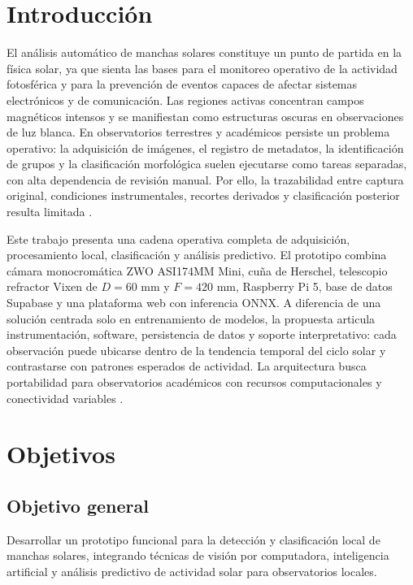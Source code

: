 \documentclass[a4paper,twocolumn,11pt]{article}
\begin{document}
\section{Introducción}
El análisis automático de manchas solares constituye un punto de partida en la física solar, ya que sienta las bases para el monitoreo operativo de la actividad fotosférica y para la prevención de eventos capaces de afectar sistemas electrónicos y de comunicación. Las regiones activas concentran campos magnéticos intensos y se manifiestan como estructuras oscuras en observaciones de luz blanca. En observatorios terrestres y académicos persiste un problema operativo: la adquisición de imágenes, el registro de metadatos, la identificación de grupos y la clasificación morfológica suelen ejecutarse como tareas separadas, con alta dependencia de revisión manual. Por ello, la trazabilidad entre captura original, condiciones instrumentales, recortes derivados y clasificación posterior resulta limitada \citep{hathaway2015solarcycle,mcintosh1990classification,noaaSRS,usaf2003sunspot}.

Este trabajo presenta una cadena operativa completa de adquisición, procesamiento local, clasificación y análisis predictivo. El prototipo combina cámara monocromática ZWO ASI174MM Mini, cuña de Herschel, telescopio refractor Vixen de $D=60$ mm y $F=420$ mm, Raspberry Pi 5, base de datos Supabase y una plataforma web con inferencia ONNX. A diferencia de una solución centrada solo en entrenamiento de modelos, la propuesta articula instrumentación, software, persistencia de datos y soporte interpretativo: cada observación puede ubicarse dentro de la tendencia temporal del ciclo solar y contrastarse con patrones esperados de actividad. La arquitectura busca portabilidad para observatorios académicos con recursos computacionales y conectividad variables \citep{zwoASI174Manual2025,luntWhiteLightWedges2026,raspberryPi5Docs2026,camporeale2019ml,clette2014revisiting}.

\section{Objetivos}
\subsection{Objetivo general}
Desarrollar un prototipo funcional para la detección y clasificación local de manchas solares, integrando técnicas de visión por computadora, inteligencia artificial y análisis predictivo de actividad solar para observatorios locales.
\end{document}
